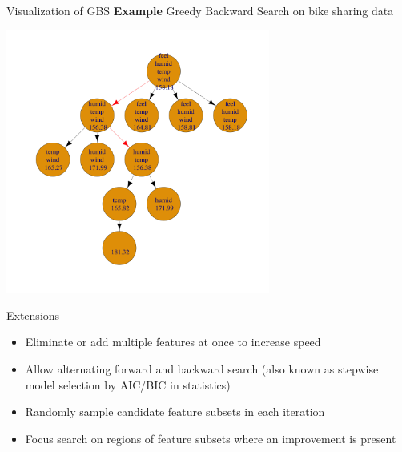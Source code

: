 \documentclass[11pt,compress,t,notes=noshow, xcolor=table]{beamer}
\begin{document}
  \begin{frame}{Visualization of GBS}
    \textbf{Example} Greedy Backward Search on bike sharing data
    \begin{center}
      \includegraphics[width = 0.65\textwidth]{figure/fs-wrappers-backwards-powerset-tree-4.png}
      \end{center}
\end{frame}

  \begin{vbframe}{Extensions}
    \vspace{-0.1cm}
    \begin{itemize}
      \setlength{\itemsep}{1.2em}
      \item Eliminate or add multiple features at once to increase speed
      \item Allow alternating forward and backward search (also known as stepwise model selection by AIC/BIC in statistics)
      \item Randomly sample candidate feature subsets in each iteration
      \item Focus search on regions of feature subsets where an improvement is present
    \end{itemize}
\end{vbframe}
\end{document}
